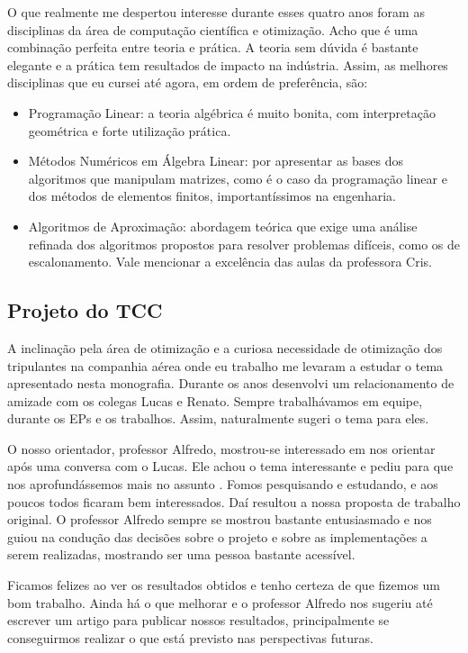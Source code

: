 O que realmente me despertou interesse durante esses quatro anos foram as disciplinas da área de
computação científica e otimização. Acho que é uma combinação perfeita entre teoria e prática. A
teoria sem dúvida é bastante elegante e a prática tem resultados de impacto na indústria. Assim,
as melhores disciplinas que eu cursei até agora, em ordem de preferência, são:

\begin{itemize}
	\item Programação Linear: a teoria algébrica é muito bonita, com interpretação geométrica e forte
	utilização prática.
	\item Métodos Numéricos em Álgebra Linear: por apresentar as bases dos algoritmos que manipulam
	matrizes, como é o caso da programação linear e dos métodos de elementos finitos, importantíssimos
	na engenharia.
	\item Algoritmos de Aproximação: abordagem teórica que exige uma análise refinada dos algoritmos
	propostos para resolver problemas difíceis, como os de escalonamento. 
	Vale mencionar a excelência das aulas da professora Cris.
\end{itemize}

\subsection{Projeto do TCC}

A inclinação pela área de otimização e a curiosa necessidade de otimização dos tripulantes na
companhia aérea onde eu trabalho me levaram a estudar o tema apresentado nesta monografia. Durante
os anos desenvolvi um relacionamento de amizade com os colegas Lucas e Renato. Sempre trabalhávamos
em equipe, durante os EPs e os trabalhos. Assim, naturalmente sugeri o tema para eles.

O nosso orientador, professor Alfredo, mostrou-se interessado em nos orientar após uma conversa com
o Lucas. Ele achou o tema interessante e pediu para que nos aprofundássemos mais no  assunto . Fomos
pesquisando e estudando, e aos poucos todos ficaram bem interessados. Daí resultou a nossa proposta
de trabalho original. O professor Alfredo sempre se mostrou bastante entusiasmado e nos guiou na
condução das decisões sobre o projeto e sobre as implementações a serem realizadas, mostrando ser
uma pessoa bastante acessível.

Ficamos felizes ao ver os resultados obtidos e tenho certeza de que fizemos um bom trabalho. Ainda
há o que melhorar e o professor Alfredo nos sugeriu até escrever um artigo para publicar nossos
resultados, principalmente se conseguirmos realizar o que está previsto nas perspectivas futuras.

